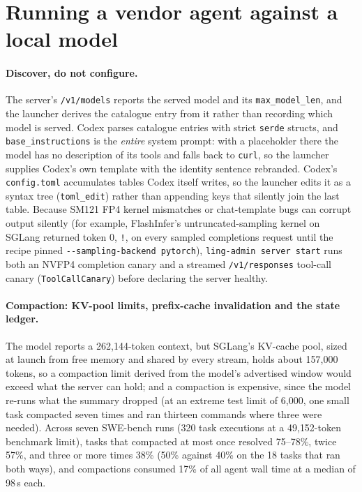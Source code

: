 \documentclass[11pt]{article}
\newcommand{\code}[1]{\texttt{#1}}
\begin{document}
\section{Running a vendor agent against a local model}
\label{sec:local}

\paragraph{Discover, do not configure.} The server's \code{/v1/models} reports the served model and
its \code{max\_model\_len}, and the launcher derives the catalogue entry from it rather than
recording which model is served. Codex parses catalogue entries with strict \code{serde} structs,
and \code{base\_instructions} is the \emph{entire} system prompt: with a placeholder there the model
has no description of its tools and falls back to \code{curl}, so the launcher supplies Codex's own
template with the identity sentence rebranded. Codex's \code{config.toml} accumulates tables Codex
itself writes, so the launcher edits it as a syntax tree (\code{toml\_edit}) rather than appending
keys that silently join the last table. Because SM121 FP4 kernel mismatches or chat-template bugs
can corrupt output silently (for example, FlashInfer's untruncated-sampling kernel on SGLang
returned token 0, \code{!}, on every sampled completions request until the recipe pinned
\code{-{}-sampling-backend pytorch}), \code{ling-admin server start} runs both an NVFP4 completion
canary and a streamed \code{/v1/responses} tool-call canary (\code{ToolCallCanary}) before
declaring the server healthy.

\paragraph{Compaction: KV-pool limits, prefix-cache invalidation and the state ledger.} The model
reports a 262{,}144-token context, but SGLang's KV-cache pool, sized at launch from free memory and
shared by every stream, holds about 157{,}000 tokens, so a compaction limit derived from the model's
advertised window would exceed what the server can hold; and a compaction is expensive, since the
model re-runs what the summary dropped (at an extreme test limit of 6{,}000, one small task
compacted seven times and ran thirteen commands where three were needed). Across seven SWE-bench
runs (320 task executions at a 49{,}152-token benchmark limit), tasks that compacted at most once
resolved 75--78\%, twice 57\%, and three or more times 38\% (50\% against 40\% on the 18 tasks that
ran both ways), and compactions consumed 17\% of all agent wall time at a median of 98\,s each.
\end{document}
